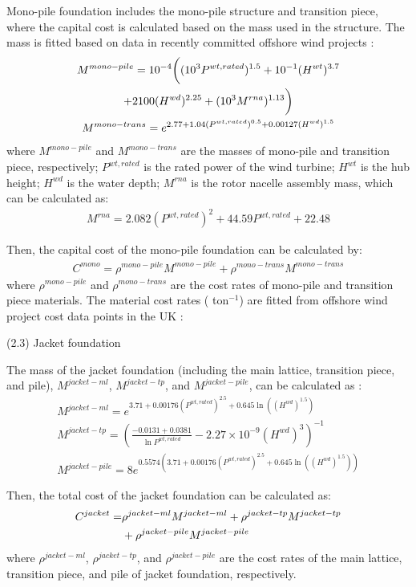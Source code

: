 \documentclass[sn-mathphys,Numbered]{sn-jnl}%
\theoremstyle{plain}%
\theoremstyle{definition}%
\theoremstyle{remark}%
\begin{document}
Mono-pile foundation includes the mono-pile structure and transition piece, where the capital cost is calculated based on the mass used in the structure. The mass is fitted based on data in recently committed offshore wind projects \cite{NRELOffshoreBalance}:
\begin{gather}
    M^{mono-pile} = 10^{-4} \bigg( (10^3 P^{wt,rated})^{1.5} + 10^{-1}(H^{wt})^{3.7} 
\notag \\
    + 2100(H^{wd})^{2.25} + (10^3 M^{rna})^{1.13} \bigg)
\\
    M^{mono-trans} = e^{2.77 + 1.04(P^{wt,rated})^{0.5} + 0.00127(H^{wd})^{1.5}}
\end{gather}
where $M^{mono-pile}$ and $M^{mono-trans}$ are the masses of mono-pile and transition piece, respectively; $P^{wt,rated}$ is the rated power of the wind turbine; $H^{wt}$ is the hub height; $H^{wd}$ is the water depth; $M^{rna}$ is the rotor nacelle assembly mass, which can be calculated as:
\begin{gather}
    M^{rna} = 2.082 (P^{wt,rated})^2 + 44.59 P^{wt,rated} + 22.48
\end{gather}

Then, the capital cost of the mono-pile foundation can be calculated by:
\begin{gather}
    C^{mono} = \rho^{mono-pile} M^{mono-pile} + \rho^{mono-trans} M^{mono-trans}
\end{gather}
where $\rho^{mono-pile}$ and $\rho^{mono-trans}$ are the cost rates of mono-pile and transition piece materials. The material cost rates (\texteuro{} ton$^{-1}$) are fitted from offshore wind project cost data points in the UK \cite{Guidetoanoffshorewindfarm}:

(2.3) Jacket foundation

The mass of the jacket foundation (including the main lattice, transition piece, and pile), $M^{jacket-ml}$, $M^{jacket-tp}$, and $M^{jacket-pile}$, can be calculated as \cite{NRELOffshoreBalance}:
\begin{gather}
    M^{jacket-ml} = e^{3.71 + 0.00176(P^{wt,rated})^{2.5} + 0.645\ln \left( {(H^{wd})}^{1.5}\right)}
\\
    M^{jacket-tp} = 
    \left( \frac{-0.0131+0.0381}{\ln{P^{wt,rated}}} -2.27\times 10^{-9} (H^{wd})^3 \right)^{-1} 
\\
    M^{jacket-pile} = 8 e^{0.5574 \left(3.71 + 0.00176(P^{wt,rated})^{2.5} + 0.645\ln \left( {(H^{wd})}^{1.5}\right)\right)}
\end{gather}

Then, the total cost of the jacket foundation can be calculated as:
\begin{align}
    C^{jacket} = & \rho^{jacket-ml} M^{jacket-ml} + \rho^{jacket-tp} M^{jacket-tp} 
    \notag\\
    & + \rho^{jacket-pile} M^{jacket-pile}
\end{align}
where $\rho^{jacket-ml}$, $\rho^{jacket-tp}$, and $\rho^{jacket-pile}$ are the cost rates of the main lattice, transition piece, and pile of jacket foundation, respectively.
\end{document}
